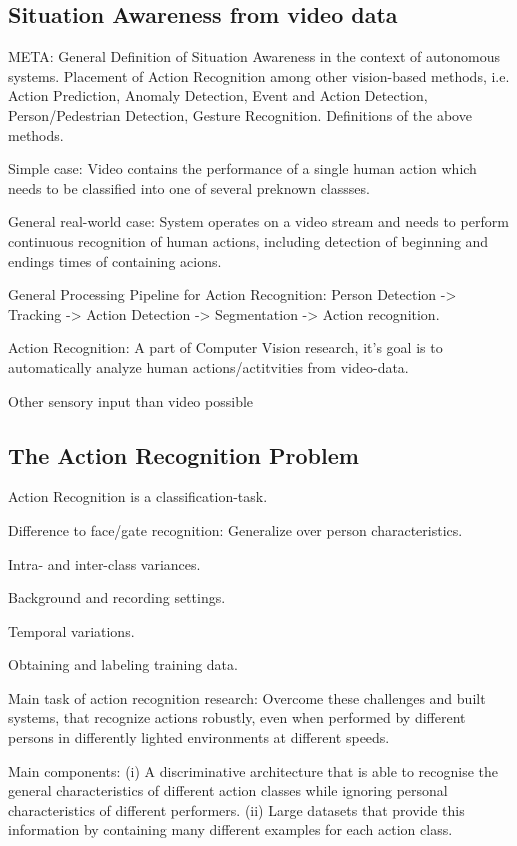 \subsection{Situation Awareness from video data}

META: General Definition of Situation Awareness in the context of autonomous systems. Placement of Action Recognition among other vision-based methods, i.e. Action Prediction, Anomaly Detection, Event and Action Detection, Person/Pedestrian Detection, Gesture Recognition. Definitions of the above methods.

Simple case: Video contains the performance of a single human action which needs to be classified into one of several preknown classses.

General real-world case: System operates on a video stream and needs to perform continuous recognition of human actions, including detection of beginning and endings times of containing acions.

General Processing Pipeline for Action Recognition: Person Detection -> Tracking -> Action Detection -> Segmentation -> Action recognition.

Action Recognition: A part of Computer Vision research, it's goal is to automatically analyze human actions/actitvities from video-data. 

Other sensory input than video possible 

\subsection{The Action Recognition Problem}
Action Recognition is a classification-task.

Difference to face/gate recognition: Generalize over person characteristics.

Intra- and inter-class variances.

Background and recording settings.

Temporal variations.

Obtaining and labeling training data.

Main task of action recognition research: Overcome these challenges and built systems, that recognize actions robustly, even when performed by different persons in differently lighted environments at different speeds.

Main components: (i) A discriminative architecture that is able to recognise the general characteristics of different action classes while ignoring personal characteristics of different performers. (ii) Large datasets that provide this information by containing many different examples for each action class.

